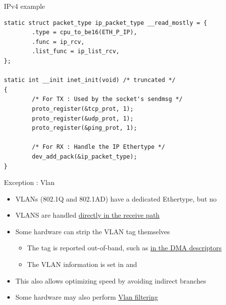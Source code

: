 \begin{frame}[fragile]{IPv4 example}
	\begin{verbatim}
static struct packet_type ip_packet_type __read_mostly = {
        .type = cpu_to_be16(ETH_P_IP),
        .func = ip_rcv,
        .list_func = ip_list_rcv,
};

static int __init inet_init(void) /* truncated */
{
        /* For TX : Used by the socket's sendmsg */
        proto_register(&tcp_prot, 1);
        proto_register(&udp_prot, 1);
        proto_register(&ping_prot, 1);

        /* For RX : Handle the IP Ethertype */
        dev_add_pack(&ip_packet_type);
}
	\end{verbatim}
\end{frame}

\begin{frame}{Exception : Vlan}
	\begin{itemize}
		\item VLANs (802.1Q and 802.1AD) have a dedicated Ethertype, but no 
		\item VLANS are handled \href{https://elixir.bootlin.com/linux/v6.15.1/source/net/core/dev.c\#L5756}{directly in the receive path}
		\item Some hardware can strip the VLAN tag themselves
			\begin{itemize}
				\item The tag is reported out-of-band, such as \href{https://elixir.bootlin.com/linux/v6.15.1/source/drivers/net/ethernet/freescale/enetc/enetc.c\#L1363}{in the DMA descriptors}
				\item The VLAN information is set in  and 
			\end{itemize}
		\item This also allows optimizing speed by avoiding indirect branches
		\item Some hardware may also perform \href{https://elixir.bootlin.com/linux/v6.15.1/source/drivers/net/ethernet/marvell/mvpp2/mvpp2_main.c\#L5295}{Vlan filtering}
	\end{itemize}
\end{frame}


